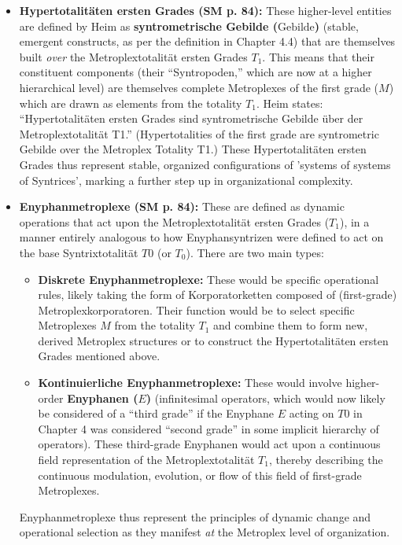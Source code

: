 \documentclass[12pt]{article}
\newcommand{\q}[1]{\enquote{#1}}
\newcommand{\syntrixtotalitaet}{T0}
\newcommand{\enyphane}{E}
\newcommand{\syntrometrischesGebilde}{\text{Gebilde}}
\def\metroplex#1#2{M}%
\newcommand{\hypersyntrix}{\metroplex{1}{F}}
\newcommand{\metroplextotalitaet}[1]{T_{#1}}
\begin{document}
\begin{itemize}
    \item \textbf{Hypertotalitäten ersten Grades (SM p. 84):}
    These higher-level entities are defined by Heim as \textbf{syntrometrische Gebilde (\(\syntrometrischesGebilde\))} (stable, emergent constructs, as per the definition in Chapter 4.4) that are themselves built \textit{over} the Metroplextotalität ersten Grades \( \metroplextotalitaet{1} \). This means that their constituent components (their \q{Syntropoden,} which are now at a higher hierarchical level) are themselves complete Metroplexes of the first grade (\( \hypersyntrix \)) which are drawn as elements from the totality \( \metroplextotalitaet{1} \). Heim states: \q{Hypertotalitäten ersten Grades sind syntrometrische Gebilde über der Metroplextotalität T1.} (Hypertotalities of the first grade are syntrometric Gebilde over the Metroplex Totality T1.) These Hypertotalitäten ersten Grades thus represent stable, organized configurations of 'systems of systems of Syntrices', marking a further step up in organizational complexity.

    \item \textbf{Enyphanmetroplexe (SM p. 84):}
    These are defined as dynamic operations that act upon the Metroplextotalität ersten Grades (\( \metroplextotalitaet{1} \)), in a manner entirely analogous to how Enyphansyntrizen were defined to act on the base Syntrixtotalität \( \syntrixtotalitaet \) (or \(T_0\)). There are two main types:
    \begin{itemize}
        \item \textbf{Diskrete Enyphanmetroplexe:} These would be specific operational rules, likely taking the form of Korporatorketten composed of (first-grade) Metroplexkorporatoren. Their function would be to select specific Metroplexes \( \hypersyntrix \) from the totality \( \metroplextotalitaet{1} \) and combine them to form new, derived Metroplex structures or to construct the Hypertotalitäten ersten Grades mentioned above.
        \item \textbf{Kontinuierliche Enyphanmetroplexe:} These would involve higher-order \textbf{Enyphanen (\(\enyphane\))} (infinitesimal operators, which would now likely be considered of a \q{third grade} if the Enyphane \( \enyphane \) acting on \( \syntrixtotalitaet \) in Chapter 4 was considered \q{second grade} in some implicit hierarchy of operators). These third-grade Enyphanen would act upon a continuous field representation of the Metroplextotalität \( \metroplextotalitaet{1} \), thereby describing the continuous modulation, evolution, or flow of this field of first-grade Metroplexes.
    \end{itemize}
    Enyphanmetroplexe thus represent the principles of dynamic change and operational selection as they manifest \textit{at} the Metroplex level of organization.


\end{itemize}
\end{document}
